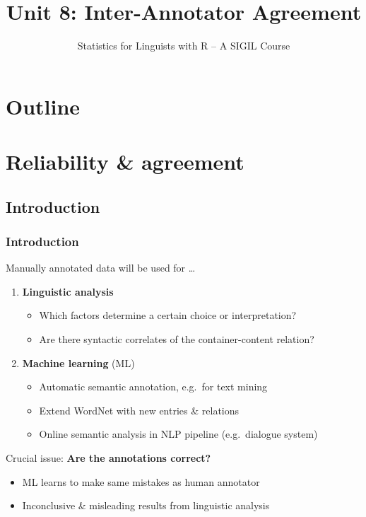 \documentclass[t]{beamer} %
\title[8.\ Inter-annotator agreement]{Unit 8: Inter-Annotator Agreement}
\subtitle{Statistics for Linguists with R -- A SIGIL Course}
\date[sigil.r-forge.r-project.org]{%
  \light{\tiny \sigilcopyright}}
\begin{document}
\frame{\titlepage}


\section*{Outline}

\section{Reliability \& agreement}

\subsection{Introduction}

\begin{frame}
  \frametitle{Introduction}

  Manually annotated data will be used for \ldots\pause
  \begin{enumerate}
  \item \textbf{Linguistic analysis}
    \begin{itemize}
    \item Which factors determine a certain choice or interpretation?
    \item Are there syntactic correlates of the container-content relation?
    \end{itemize}
    \pause
  \item \textbf{Machine learning} (ML)
    \begin{itemize}
    \item Automatic semantic annotation, e.g.\ for text mining
    \item Extend WordNet with new entries \& relations
    \item Online semantic analysis in NLP pipeline (e.g.\ dialogue system)
    \end{itemize}
    \pause
  \end{enumerate}

  \gap[1]
  Crucial issue: \textbf{Are the annotations correct?}
  \begin{itemize}
  \item[\hand] ML learns to make same mistakes as human annotator
  \item[\hand] Inconclusive \& misleading results from linguistic analysis
  \end{itemize}
\end{frame}
\end{document}

